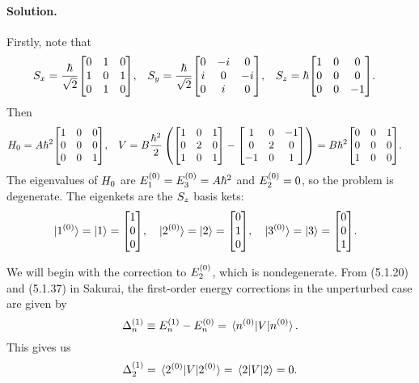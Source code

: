 \documentclass[11pt]{article}
\newcommand{\beq}{\begin{equation*}}
\newcommand{\eeq}{\end{equation*}}
\newenvironment{solution}
{
    \paragraph{Solution.}
    \ignorespaces
}
{
}
\begin{document}
\begin{solution}
	Firstly, note that
	\begin{align*}
		\Sx &= \frac{\hbar}{\sqrt{2}} \mqty[ 0 & 1 & 0 \\ 1 & 0 & 1 \\ 0 & 1 & 0 ], &
		\Sy &= \frac{\hbar}{\sqrt{2}} \mqty[ 0 & -i & 0 \\ i & 0 & -i \\ 0 & i & 0 ], &
		\Sz &= \hbar \mqty[ 1 & 0 & 0 \\ 0 & 0 & 0 \\ 0 & 0 & -1 ].
	\end{align*}
	Then
	\begin{align*}
		\Ho &= A \hbar^2 \mqty[ 1 & 0 & 0 \\ 0 & 0 & 0 \\ 0 & 0 & 1 ], &
		V &= B \frac{\hbar^2}{2} \left( \mqty[ 1 & 0 & 1 \\ 0 & 2 & 0 \\ 1 & 0 & 1 ] - \mqty[ 1 & 0 & -1 \\ 0 & 2 & 0 \\ -1 & 0 & 1 ] \right)
		= B \hbar^2 \mqty[ 0 & 0 & 1 \\ 0 & 0 & 0 \\ 1 & 0 & 0 ].
	\end{align*}
	The eigenvalues of $H_0$ are $E^{(0)}_1 = E^{(0)}_3 = A \hbar^2$ and $E^{(0)}_2 = 0$, so the problem is degenerate.  The eigenkets are the $S_z$ basis kets:
	\begin{align*}
		\koq &= \kq = \mqty[ 1 \\ 0 \\ 0 ], &
		\kow &= \kw = \mqty[ 0 \\ 1 \\ 0 ], &
		\koe &= \ke = \mqty[ 0 \\ 0 \\ 1 ].
	\end{align*}
	
	We will begin with the correction to $E^{(0)}_2$, which is nondegenerate.  From (5.1.20) and (5.1.37) in Sakurai, the first-order energy corrections in the unperturbed case are given by
	\beq
		\Deln \equiv \Eqn - \Eon = \mel*{n\suo}{V}{n\suo}.
	\eeq
	This gives us
	\beq
		\Delw = \mel*{2\suo}{V}{2\suo} = \mel{2}{V}{2} = 0.
	\eeq
	

\end{solution}
\end{document}
